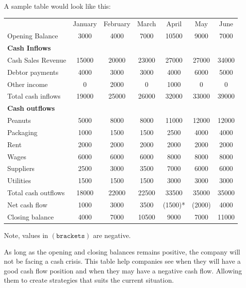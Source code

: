 \documentclass{standalone}
\begin{document}
A sample table would look like this:
\begin{tabular}{l c c c c c c}
                             & January & February & March & April   & May    & June \\
    Opening Balance          & 3000    & 4000     & 7000  & 10500   & 9000   & 7000 \\
    \textbf{Cash Inflows}    &         &          &       &         &        & \\
    Cash Sales Revenue       & 15000   & 20000    & 23000 & 27000   & 27000  & 34000 \\
    Debtor payments          & 4000    & 3000     & 3000  & 4000    & 6000   & 5000 \\
    Other income             & 0       & 2000     & 0     & 1000    & 0      & 0 \\
    Total cash inflows       & 19000   & 25000    & 26000 & 32000   & 33000  & 39000 \\
    \textbf{Cash outflows}   &         &          &       &         &        & \\
    Peanuts                  & 5000    & 8000     & 8000  & 11000   & 12000  & 12000 \\
    Packaging                & 1000    & 1500     & 1500  & 2500    & 4000   & 4000 \\
    Rent                     & 2000    & 2000     & 2000  & 2000    & 2000   & 2000 \\
    Wages                    & 6000    & 6000     & 6000  & 8000    & 8000   & 8000 \\
    Suppliers                & 2500    & 3000     & 3500  & 7000    & 6000   & 6000 \\
    Utilities                & 1500    & 1500     & 1500  & 3000    & 3000   & 3000 \\
    Total cash outflows      & 18000   & 22000    & 22500 & 33500   & 35000  & 35000 \\
    Net cash flow            & 1000    & 3000     & 3500  & (1500)* & (2000) & 4000 \\
    Closing balance          & 4000    & 7000     & 10500 & 9000    & 7000   & 11000
\end{tabular}

Note, values in $(\texttt{brackets})$ are negative.

As long as the opening and closing balances remains positive, the company will not be facing a cash crisis.
This table help companies see when they will have a good cash flow position and when they may have a negative cash flow.
Allowing them to create strategies that suits the current situation.
\end{document}
